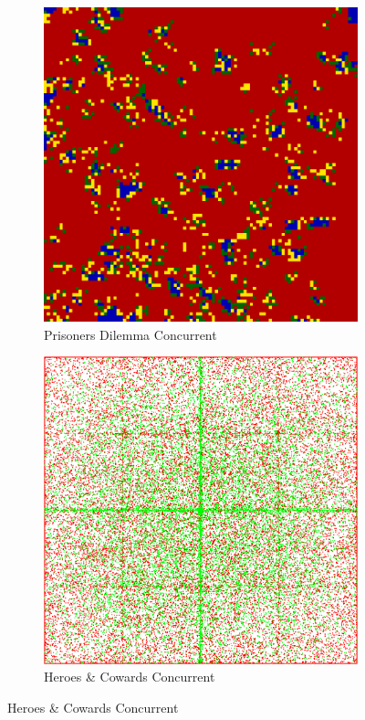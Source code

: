 \begin{figure}
    \begin{subfigure}[b]{0.4\textwidth}
		\centering
       	\includegraphics[width=.7\textwidth, angle=0]{./fig/con_99x99_436steps_MSG_haskell.png}
        \caption{Prisoners Dilemma Concurrent}
        \label{fig:pd_con}
    \end{subfigure}
    \begin{subfigure}[b]{0.4\textwidth}
    	\centering
        \includegraphics[width=.7\textwidth, angle=0]{./fig/con_HAC_100_000_500steps_java.png}
        \caption{Heroes \& Cowards Concurrent}
        \label{fig:hac_con}
    \end{subfigure}



\end{figure}
